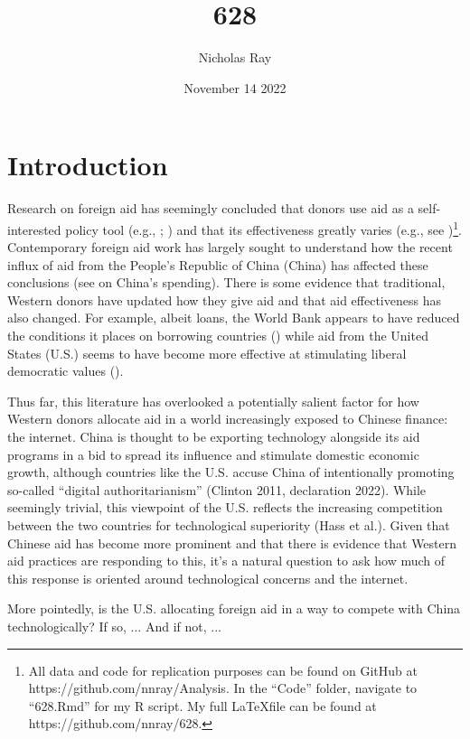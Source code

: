 \documentclass[12pt]{article}
\title{\vspace{-2.75cm}628\vspace{-0.5cm}}
\author{Nicholas Ray}
\date{\vspace{-0.30cm}November 14 2022\vspace{-1cm}}
\begin{document}
\maketitle
\begin{abstract}
    
\end{abstract}
\section*{Introduction}
Research on foreign aid has seemingly concluded that donors use aid as a self-interested policy tool (e.g., \cite{alesina2000}; \cite{hoeffler2011}) and that its effectiveness greatly varies (e.g., see \cite{christensen2011})\footnote{All data and code for replication purposes can be found on GitHub at https://github.com/nnray/Analysis. In the ``Code'' folder, navigate to ``628.Rmd'' for my R script. My full \LaTeX \;file can be found at https://github.com/nnray/628.}. Contemporary foreign aid work has largely sought to understand how the recent influx of aid from the People's Republic of China (China) has affected these conclusions (see \cite{dreher2022} on China's spending). There is some evidence that traditional, Western donors have updated how they give aid and that aid effectiveness has also changed. For example, albeit loans, the World Bank appears to have reduced the conditions it places on borrowing countries (\cite{hernandez2017}) while aid from the United States (U.S.) seems to have become more effective at stimulating liberal democratic values (\cite{blair2022}).

Thus far, this literature has overlooked a potentially salient factor for how Western donors allocate aid in a world increasingly exposed to Chinese finance: the internet. China is thought to be exporting technology alongside its aid programs in a bid to spread its influence and stimulate domestic economic growth, although countries like the U.S. accuse China of intentionally promoting so-called ``digital authoritarianism'' (Clinton 2011, declaration 2022). While seemingly trivial, this viewpoint of the U.S. reflects the increasing competition between the two countries for technological superiority (Hass et al.). Given that Chinese aid has become more prominent and that there is evidence that Western aid practices are responding to this, it's a natural question to ask how much of this response is oriented around technological concerns and the internet. 

More pointedly, is the U.S. allocating foreign aid in a way to compete with China technologically? If so, ... And if not, ... 
\end{document}
